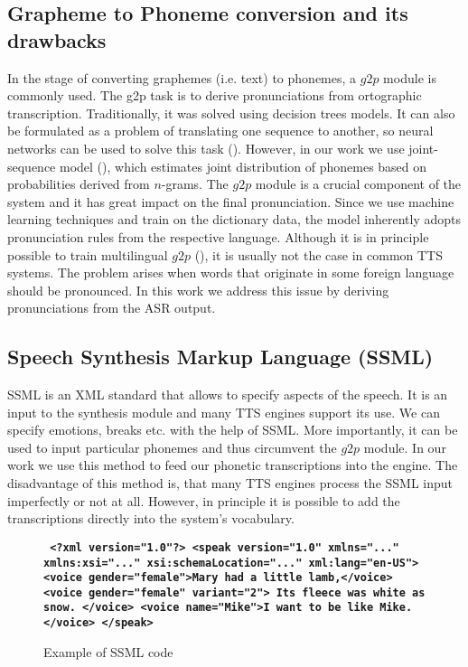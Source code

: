 \subsection*{Grapheme to Phoneme conversion and its drawbacks}
\label{g2p-desc}
In the stage of converting graphemes (i.e. text) to phonemes, a $g2p$ module is commonly used.
The g2p task is to derive pronunciations from ortographic transcription.
Traditionally, it was solved using decision trees models.
It can also be formulated as a problem of translating one sequence to another, so neural networks can be used to solve this task (\cite{yao2015sequence}).
However, in our work we use joint-sequence model (\cite{bisani2008joint}), which estimates joint distribution of phonemes based on probabilities derived from $n$-grams.
The $g2p$ module is a crucial component of the system and it has great impact on the final pronunciation.
Since we use machine learning techniques and train on the dictionary data, the model inherently adopts pronunciation rules from the respective language.
Although it is in principle possible to  train multilingual $g2p$ (\cite{schlippe2012grapheme}), it is usually not the case in common TTS systems.
The problem arises when words that originate in some foreign language should be pronounced.
In this work we address this issue by deriving pronunciations from the ASR output.
\subsection*{Speech Synthesis Markup Language (SSML)}
\label{SSML}
\cite{taylor1997ssml}
SSML is an XML standard that allows to specify aspects of the speech.
It is an input to the synthesis module and many TTS engines support its use.
We can specify emotions, breaks etc. with the help of SSML.
More importantly, it can be used to input particular phonemes and thus circumvent the $g2p$ module.
In our work we use this method to feed our phonetic transcriptions into the engine.
The disadvantage of this method is, that many TTS engines process the SSML input imperfectly or not at all.
However, in principle it is possible to add the transcriptions directly into the system's vocabulary.
\begin{center}
\begin{figure}
\textbf{\texttt{
<?xml version="1.0"?>
<speak version="1.0" xmlns="..."
         xmlns:xsi="..."
         xsi:schemaLocation="..."
         xml:lang="en-US">\linebreak
  \tab <voice gender="female">Mary had a little lamb,</voice>\linebreak
  \tab <voice gender="female" variant="2">\linebreak
  \tab\tab Its fleece was white as snow.\linebreak
  \tab</voice>\linebreak
  \tab<voice name="Mike">I want to be like Mike.</voice>\linebreak
</speak>
}}
\label{ssml_example}
\caption{Example of SSML code}
\end{figure}
\end{center}

